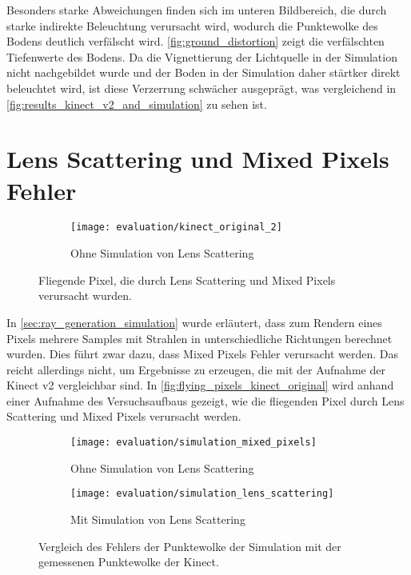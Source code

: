 \documentclass[thesis.tex]{subfiles}
\begin{document}
Besonders starke Abweichungen finden sich im unteren Bildbereich, die durch starke indirekte Beleuchtung verursacht wird, wodurch die Punktewolke des Bodens deutlich verfälscht wird. \autoref{fig:ground_distortion} zeigt die verfälschten Tiefenwerte des Bodens. Da die Vignettierung der Lichtquelle in der Simulation nicht nachgebildet wurde und der Boden in der Simulation daher stärtker direkt beleuchtet wird, ist diese Verzerrung schwächer ausgeprägt, was vergleichend in \autoref{fig:results_kinect_v2_and_simulation} zu sehen ist.

\section{Lens Scattering und Mixed Pixels Fehler}\label{sec:evaluation_lens_scattering}

\begin{figure}[h!]
\centering
\begin{subfigure}{0.49\textwidth}
    \texttt{[image: evaluation/kinect\_original\_2]}
    \caption{Ohne Simulation von Lens Scattering}
\end{subfigure}
\caption{Fliegende Pixel, die durch Lens Scattering und Mixed Pixels verursacht wurden.}
\label{fig:flying_pixels_kinect_original}
\end{figure}

In \autoref{sec:ray_generation_simulation} wurde erläutert, dass zum Rendern eines Pixels mehrere Samples mit Strahlen in unterschiedliche Richtungen berechnet wurden. Dies führt zwar dazu, dass Mixed Pixels Fehler verursacht werden. Das reicht allerdings nicht, um Ergebnisse zu erzeugen, die mit der Aufnahme der Kinect v2 vergleichbar sind. In \autoref{fig:flying_pixels_kinect_original} wird anhand einer Aufnahme des Versuchsaufbaus gezeigt, wie die fliegenden Pixel durch Lens Scattering und Mixed Pixels verursacht werden.

\begin{figure}[h!]
\centering
\begin{subfigure}{0.49\textwidth}
    \texttt{[image: evaluation/simulation\_mixed\_pixels]}
    \caption{Ohne Simulation von Lens Scattering}
    \label{fig:simulation_without_lens_scattering}
\end{subfigure}
\begin{subfigure}{0.49\textwidth}
    \texttt{[image: evaluation/simulation\_lens\_scattering]}
    \caption{Mit Simulation von Lens Scattering}
    \label{fig:simulation_with_lens_scattering}
\end{subfigure}
\caption{Vergleich des Fehlers der Punktewolke der Simulation mit der gemessenen Punktewolke der Kinect.}
\label{fig:simulation_mixed_pixels_and_lens_scattering}
\end{figure}
\end{document}
